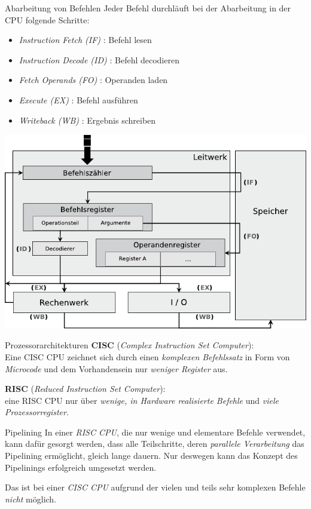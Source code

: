 \begin{bonus}{Abarbeitung von Befehlen}
    Jeder Befehl durchläuft bei der Abarbeitung in der CPU folgende Schritte:
    \begin{itemize}
        \item \emph{Instruction Fetch (IF)} : Befehl lesen
        \item \emph{Instruction Decode (ID)} : Befehl decodieren
        \item \emph{Fetch Operands (FO)} : Operanden laden
        \item \emph{Execute (EX)} : Befehl ausführen
        \item \emph{Writeback (WB)} : Ergebnis schreiben
    \end{itemize}

    \begin{center}
        \includegraphics[]{images/befehlsabarbeitung.pdf}
    \end{center}
\end{bonus}

\begin{defi}{Prozessorarchitekturen}
    \textbf{CISC} (\emph{Complex Instruction Set Computer}):\\
    Eine CISC CPU zeichnet sich durch einen \emph{komplexen Befehlssatz} in Form von \emph{Microcode} und dem Vorhandensein nur \emph{weniger Register} aus.

    \textbf{RISC} (\emph{Reduced Instruction Set Computer}):\\
    eine RISC CPU nur über \emph{wenige, in Hardware realisierte Befehle} und \emph{viele Prozessorregister}.
\end{defi}

\begin{defi}{Pipelining}
    In einer \emph{RISC CPU}, die nur wenige und elementare Befehle verwendet, kann dafür
    gesorgt werden, dass alle Teilschritte, deren \emph{parallele Verarbeitung} das Pipelining
    ermöglicht, gleich lange dauern. Nur deswegen kann das Konzept des Pipelinings
    erfolgreich umgesetzt werden.

    Das ist bei einer \emph{CISC CPU} aufgrund der vielen
    und teils sehr komplexen Befehle \emph{nicht} möglich.
\end{defi}

